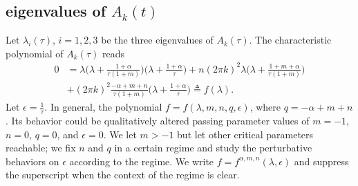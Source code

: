\documentclass[a4paper,11pt]{article}
\theoremstyle{remark}
\begin{document}
\subsection{eigenvalues of $A_k(t)$}
Let $\lambda_i(\tau)$, $i=1,2,3$ be the three eigenvalues of $A_k(\tau)$. %
The characteristic polynomial of $A_k(\tau)$ reads
% 
% 
% 
% 
\begin{align}
0&= \lambda\Big(\lambda + \frac{1+\alpha}{\tau(1+m)}\Big)\Big(\lambda + \frac{1+\alpha}{\tau}\Big) + n(2\pi k)^2\lambda\Big(\lambda + \frac{1+m+\alpha}{\tau(1+m)}\Big)\nonumber\\
&+ (2\pi k)^2\frac{-\alpha+m+n}{\tau(1+m)}\Big(\lambda + \frac{1+\alpha}{\tau}\Big)\triangleq f(\lambda). \label{eq:poly}
\end{align}
Let $\epsilon = \frac{1}{\tau}$. In general, the polynomial $f=f(\lambda,m,n,q,\epsilon)$, where $q=-\alpha+m+n$. Its behavior could be qualitatively altered passing parameter values of $m=-1$, $n=0$, $q=0$, and $\epsilon=0$. We  let $m>-1$ but let other critical parameters reachable; we fix $n$ and $q$ in a certain regime and study the perturbative behaviors on $\epsilon$ according to the regime. We write $f= f^{\alpha,m,n}(\lambda,\epsilon)$ and suppress the superscript when the context of the regime is clear.
\end{document}
